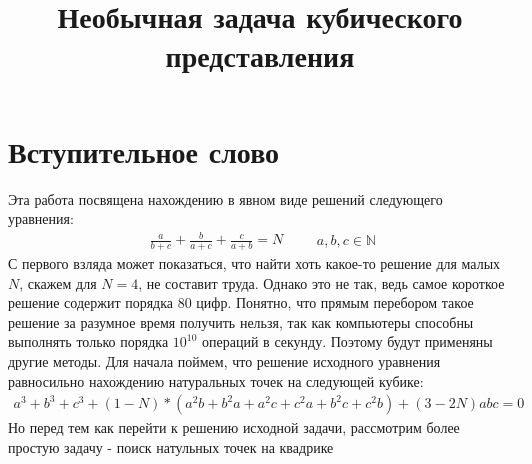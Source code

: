 \title{Необычная задача кубического представления}  
\date{}  
\author{}

\maketitle  
\section*{Вступительное слово}
Эта работа посвящена  нахождению в явном виде решений следующего уравнения: \newline
\[
\begin{aligned}
\frac{a} {b + c}  + \frac{b}{a  + c} + \frac{c}{a+b} = N
\end{aligned} \qquad a, b, c \in \mathbb{N}
\] 
\newline
С первого взляда может показаться, что найти хоть какое-то решение для малых $N$, скажем для $N = 4$, не составит труда. Однако это не так, ведь самое короткое решение содержит порядка 80 цифр. Понятно, что прямым перебором такое решение за разумное время получить нельзя, так как компьютеры способны выполнять только порядка $10^{10}$ операций в секунду. Поэтому будут применяны другие методы.
Для начала поймем, что решение исходного уравнения равносильно нахождению натуральных точек на следующей кубике:
\newline
\[
\begin{aligned}
	a^3 + b^3 + c^3 + (1 - N) * (a^2b + b^2a + a^2c + c^2a + b^2c + c^2b) +(3 - 2N)abc = 0
\end{aligned} 
\] 
\newline
Но перед тем как перейти к решению исходной задачи, рассмотрим более простую задачу - поиск натульных точек на квадрике 

